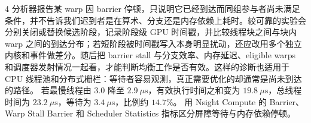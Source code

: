 \begin{solutionexercise}{4}
分析器报告某 warp 因 barrier 停顿，只说明它已经到达而同组参与者尚未满足条件，并不告诉我们迟到者是在算术、分支还是内存依赖上耗时。较可靠的实验会分别关闭或替换候选阶段，记录阶段级 GPU 时间戳，并比较线程块之间与块内 warp 之间的到达分布；若短阶段被时间戳写入本身明显扰动，还应改用多个独立内核和事件做差分。随后把 barrier stall 与分支效率、内存延迟、eligible warps 和调度器发射情况一起看，才能判断均衡工作是否有效。这样的诊断也适用于 CPU 线程池和分布式栅栏：等待者容易观测，真正需要优化的却通常是尚未到达的路径。
\variantheading 若最慢线程由 $3.0$ 降至 $2.9\ \mu\mathrm{s}$，有效执行时间之和变为 $19.8\ \mu\mathrm{s}$，总线程时间为 $23.2\ \mu\mathrm{s}$，等待为 $3.4\ \mu\mathrm{s}$，比例约 $14.7\%$。
\practiceheading 用 Nsight Compute 的 Barrier、Warp Stall Barrier 和 Scheduler Statistics 指标区分屏障等待与内存依赖停顿。
\end{solutionexercise}

